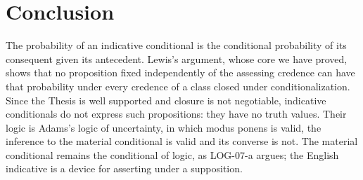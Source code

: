 \documentclass{situationist-preprint}
\begin{document}
\section{Conclusion}

The probability of an indicative conditional is the conditional probability of its consequent given its antecedent. Lewis's argument, whose core we have proved, shows that no proposition fixed independently of the assessing credence can have that probability under every credence of a class closed under conditionalization. Since the Thesis is well supported and closure is not negotiable, indicative conditionals do not express such propositions: they have no truth values. Their logic is Adams's logic of uncertainty, in which modus ponens is valid, the inference to the material conditional is valid and its converse is not. The material conditional remains the conditional of logic, as LOG-07-a argues; the English indicative is a device for asserting under a supposition.
\end{document}
